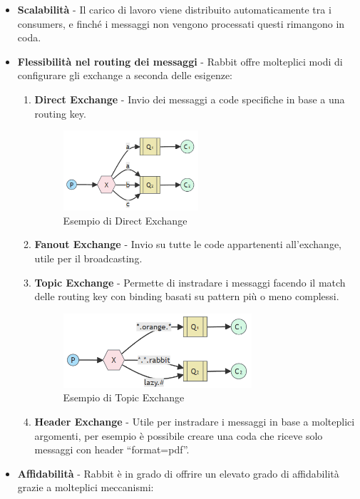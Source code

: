 \begin{itemize}
  \item \textbf{Scalabilit\`a} -  Il carico di lavoro viene distribuito automaticamente tra i consumers, e finch\'e i messaggi
    non vengono processati questi rimangono in coda.
  \item \textbf{Flessibilit\`a nel routing dei messaggi} - Rabbit offre molteplici modi di configurare gli exchange a seconda delle esigenze:
    \begin{enumerate}
      \item \textbf{Direct Exchange} - Invio dei messaggi a code specifiche in base a una routing key.
        \begin{figure}[H]
          \centering
          \includegraphics[width=5cm]{images/rabbitmq-direct-exchange.png}
          \caption{Esempio di Direct Exchange\cite{rabbitmq}}
        \end{figure}
      \item \textbf{Fanout Exchange} - Invio su tutte le code appartenenti all'exchange, utile per il broadcasting.
      \item \textbf{Topic Exchange} - Permette di instradare i messaggi facendo il match delle routing key con binding basati su pattern pi\`u o meno complessi.
        \begin{figure}[H]
          \centering
          \includegraphics[width=7cm]{images/rabbitmq-topic-exchange.png}
          \caption{Esempio di Topic Exchange\cite{rabbitmq}}
        \end{figure}
      \item \textbf{Header Exchange} - Utile per instradare i messaggi in base a molteplici argomenti, per esempio \`e possibile creare una coda
        che riceve solo messaggi con header ``format=pdf''.
    \end{enumerate}
  \item \textbf{Affidabilit\`a} -  Rabbit \`e in grado di offrire un elevato grado di affidabilit\`a grazie a  molteplici meccanismi:

\end{itemize}
